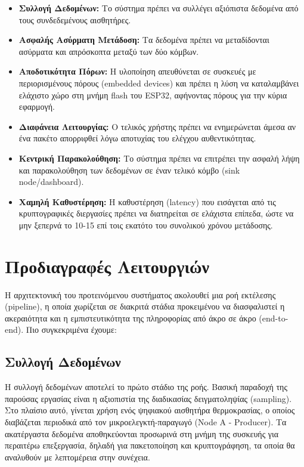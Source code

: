 \documentclass[runningheads]{llncs}
\begin{document}
    \begin{itemize}
        \item \textbf{Συλλογή Δεδομένων:} Το σύστημα πρέπει να συλλέγει αξιόπιστα δεδομένα από τους συνδεδεμένους αισθητήρες.
        \item \textbf{Ασφαλής Ασύρματη Μετάδοση:} Τα δεδομένα πρέπει να μεταδίδονται ασύρματα και απρόσκοπτα μεταξύ των δύο κόμβων.
        \item \textbf{Αποδοτικότητα Πόρων:} Η υλοποίηση απευθύνεται σε συσκευές με περιορισμένους πόρους (embedded devices) και πρέπει η λύση να καταλαμβάνει ελάχιστο χώρο στη μνήμη flash του ESP32, αφήνοντας πόρους για την κύρια εφαρμογή. 
        \item \textbf{Διαφάνεια Λειτουργίας:} Ο τελικός χρήστης πρέπει να ενημερώνεται άμεσα αν ένα πακέτο απορριφθεί λόγω αποτυχίας του ελέγχου αυθεντικότητας.
        \item \textbf{Κεντρική Παρακολούθηση:} Το σύστημα πρέπει να επιτρέπει την ασφαλή λήψη και παρακολούθηση των δεδομένων σε έναν τελικό κόμβο (sink node/dashboard).
        \item \textbf{Χαμηλή Καθυστέρηση:} Η καθυστέρηση (latency) που εισάγεται από τις κρυπτογραφικές διεργασίες πρέπει να διατηρείται σε ελάχιστα επίπεδα, ώστε να μην ξεπερνά το 10-15 επί τοις εκατότο του συνολικού χρόνου μετάδοσης.
    \end{itemize}


\section{Προδιαγραφές Λειτουργιών} %
    

Η αρχιτεκτονική του προτεινόμενου συστήματος ακολουθεί μια ροή εκτέλεσης (pipeline), η οποία χωρίζεται σε διακριτά στάδια προκειμένου να διασφαλιστεί η ακεραιότητα και η εμπιστευτικότητα της πληροφορίας από άκρο σε άκρο (end-to-end).
Πιο συγκεκριμένα έχουμε:

\subsection{Συλλογή Δεδομένων}
Η συλλογή δεδομένων αποτελεί το πρώτο στάδιο της ροής. Βασική παραδοχή της παρούσας εργασίας είναι η αξιοπιστία της διαδικασίας δειγματοληψίας (sampling). Στο πλαίσιο αυτό, γίνεται χρήση ενός ψηφιακού αισθητήρα θερμοκρασίας, ο οποίος διαβάζεται περιοδικά από τον μικροελεγκτή-παραγωγό (Node A - Producer). 
Τα ακατέργαστα δεδομένα αποθηκεύονται προσωρινά στη μνήμη της συσκευής για περαιτέρω επεξεργασία, δηλαδή για πακετοποίηση και κρυπτογράφηση,  τα οποία θα αναλυθούν με λεπτομέρεια στην συνέχεια.
\end{document}

